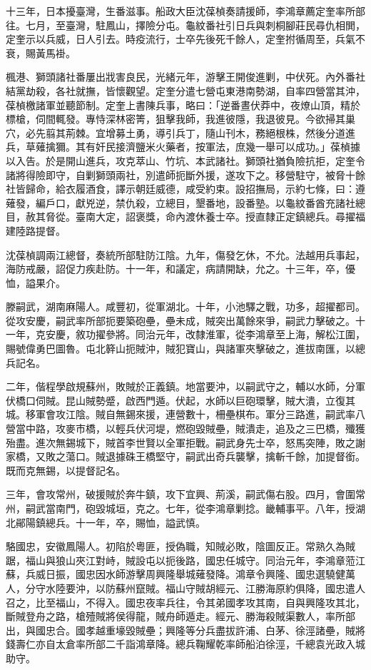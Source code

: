 \begin{pinyinscope}
十三年，日本擾臺灣，生番滋事。船政大臣沈葆楨奏請援師，李鴻章薦定奎率所部往。七月，至臺灣，駐鳳山，擇險分屯。龜紋番社引日兵與刺桐腳莊民尋仇相閧，定奎示以兵威，日人引去。時疫流行，士卒先後死千餘人，定奎拊循周至，兵氣不衰，賜黃馬褂。

楓港、獅頭諸社番屢出戕害良民，光緒元年，游擊王開俊進剿，中伏死。內外番社結黨劫殺，各社就撫，皆懷觀望。定奎分遣七營屯東港南勢湖，自率四營當其沖，葆楨檄諸軍並聽節制。定奎上書陳兵事，略曰：「逆番晝伏莽中，夜燎山頂，精於標槍，伺間輒發。專恃深林密箐，狙擊我師，我進彼隱，我退彼見。今欲掃其巢穴，必先翦其荊棘。宜增募土勇，導引兵丁，隨山刊木，務絕根株，然後分道進兵，草薙擒獮。其有奸民接濟鹽米火藥者，按軍法，庶幾一舉可以成功。」葆楨據以入告。於是開山進兵，攻克萃山、竹坑、本武諸社。獅頭社猶負險抗拒，定奎令諸將得險即守，自剿獅頭兩社，別遣師扼斷外援，遂攻下之。移營駐守，被脅十餘社皆歸命，給衣履酒食，譯示朝廷威德，咸受約束。設招撫局，示約七條，曰：遵薙發，編戶口，獻兇逆，禁仇殺，立總目，墾番地，設番塾。以龜紋番酋充諸社總目，赦其脅從。臺南大定，詔褒獎，命內渡休養士卒。授直隸正定鎮總兵。尋擢福建陸路提督。

沈葆楨調兩江總督，奏統所部駐防江陰。九年，傷發乞休，不允。法越用兵事起，海防戒嚴，詔促力疾赴防。十一年，和議定，病請開缺，允之。十三年，卒，優恤，謚果介。

滕嗣武，湖南麻陽人。咸豐初，從軍湖北。十年，小池驛之戰，功多，超擢都司。從攻安慶，嗣武率所部扼要築砲壘，壘未成，賊突出萬餘來爭，嗣武力擊破之。十一年，克安慶，敘功擢參將。同治元年，改隸淮軍，從李鴻章至上海，解松江圍，賜號偉勇巴圖魯。屯北簳山扼賊沖，賊犯寶山，與諸軍夾擊破之，進拔南匯，以總兵記名。

二年，偕程學啟規蘇州，敗賊於正義鎮。地當要沖，以嗣武守之，輔以水師，分軍伏橋口伺賊。昆山賊勢蹙，啟西門遁。伏起，水師以巨砲環擊，賊大潰，立復其城。移軍會攻江陰。賊自無錫來援，連營數十，柵壘棋布。軍分三路進，嗣武率八營當中路，攻麥市橋，以輕兵伏河堤，燃砲毀賊壘，賊潰走，追及之三巴橋，殲獲殆盡。進次無錫城下，賊首李世賢以全軍拒戰。嗣武身先士卒，怒馬突陣，敗之謝家橋，又敗之蕩口。賊退據硃王橋堅守，嗣武出奇兵襲擊，擒斬千餘，加提督銜。既而克無錫，以提督記名。

三年，會攻常州，破援賊於奔牛鎮，攻下宜興、荊溪，嗣武傷右股。四月，會圍常州，嗣武當南門，砲毀城垣，克之。七年，從李鴻章剿捻。畿輔事平。八年，授湖北鄖陽鎮總兵。十一年，卒，賜恤，謚武慎。

駱國忠，安徽鳳陽人。初陷於粵匪，授偽職，知賊必敗，陰圖反正。常熟久為賊踞，福山與狼山夾江對峙，賊設屯以扼後路，國忠任城守。同治元年，李鴻章蒞江蘇，兵威日振，國忠因水師游擊周興隆舉城薙發降。鴻章令興隆、國忠選驍健萬人，分守水陸要沖，以防蘇州竄賊。福山守賊胡經元、江勝海原約俱降，國忠遣人召之，比至福山，不得入。國忠夜率兵往，令其弟國孝攻其南，自與興隆攻其北，斷賊登舟之路，槍殪賊將侯得龍，賊舟師遁走。經元、勝海殺賊渠數人，率所部出，與國忠合。國孝越重壕毀賊壘；興隆等分兵盡拔許浦、白茅、徐涇諸壘，賊將錢壽仁亦自太倉率所部二千詣鴻章降。總兵鞠耀乾率師船泊徐涇，千總袁光政入城助守。


\end{pinyinscope}
